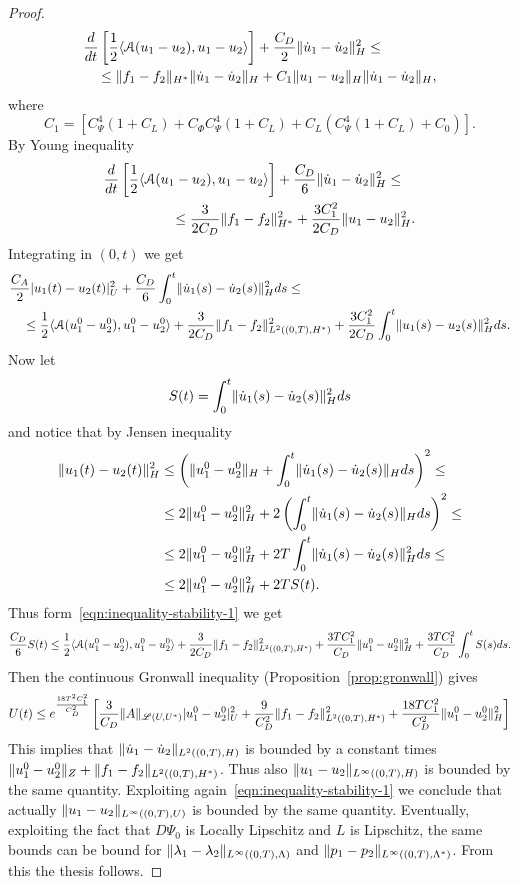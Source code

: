 \documentclass[a4paper,10pt,oneside]{amsbook}
\numberwithin{section}{chapter}
\numberwithin{equation}{chapter}
\theoremstyle{definition}
\DeclarePairedDelimiter{\norm}{\lVert}{\rVert}
\DeclarePairedDelimiter{\dual}{\langle}{\rangle}
\begin{document}
\begin{proof}
\[
\begin{multlined}
\frac{d}{dt}\left[\frac{1}{2}\dual{\mathcal{A}(u_1-u_2),u_1-u_2}\right]+\frac{C_D}{2}\norm{\dot u_1-\dot u_2}_H^2\le\\
\le\norm{f_1-f_2}_{H^*}\norm{\dot u_1-\dot u_2}_H+C_1\norm{u_1-u_2}_H\norm{\dot u_1-\dot u_2}_H,
\end{multlined}
\]
where
\[
C_1=\left[C_\Psi^4(1+C_L)+C_\Phi C_\Psi^4(1+C_L)+C_L(C_\Psi^4(1+C_L)+C_0)\right].
\]
By Young inequality
\[
\begin{multlined}
\frac{d}{dt}\left[\frac{1}{2}\dual{\mathcal{A}(u_1-u_2),u_1-u_2}\right]+\frac{C_D}{6}\norm{\dot u_1-\dot u_2}_H^2\le\\
\le\frac{3}{2C_D}\norm{f_1-f_2}_{H^*}^2+\frac{3C_1^2}{2C_D}\norm{u_1-u_2}_H^2.
\end{multlined}
\]
Integrating in $(0,t)$ we get
\begin{equation}
\label{eqn:inequality-stability-1}
\begin{multlined}
\frac{C_A}{2}|u_1(t)-u_2(t)|_U^2+\frac{C_D}{6}\int_0^t\norm{\dot u_1(s)-\dot u_2(s)}_H^2ds\le\\
\le\frac{1}{2}\dual{\mathcal{A}(u_1^0-u_2^0),u_1^0-u_2^0}+\frac{3}{2C_D}\norm{f_1-f_2}_{L^2((0,T),H^*)}^2+\frac{3C_1^2}{2C_D}\int_0^t\norm{u_1(s)-u_2(s)}_H^2ds.
\end{multlined}
\end{equation}
Now let
\[
S(t)=\int_0^t\norm{\dot u_1(s)-\dot u_2(s)}_H^2ds
\]
and notice that by Jensen inequality
\[
\begin{split}
\norm{u_1(t)-u_2(t)}_H^2&\le\left(\norm{u_1^0-u_2^0}_H+\int_0^t\norm{\dot u_1(s)-\dot u_2(s)}_Hds\right)^2\le\\
&\le2\norm{u_1^0-u_2^0}_H^2+2\left(\int_0^t\norm{\dot u_1(s)-\dot u_2(s)}_Hds\right)^2\le\\
&\le2\norm{u_1^0-u_2^0}_H^2+2T\int_0^t\norm{\dot u_1(s)-\dot u_2(s)}_H^2ds\le\\
&\le2\norm{u_1^0-u_2^0}_H^2+2TS(t).
\end{split}
\]
Thus form~\eqref{eqn:inequality-stability-1} we get
\[
\frac{C_D}{6}S(t)\le\frac{1}{2}\dual{\mathcal{A}(u_1^0-u_2^0),u_1^0-u_2^0}+\frac{3}{2C_D}\norm{f_1-f_2}_{L^2((0,T),H^*)}^2+\frac{3TC_1^2}{C_D}\norm{u_1^0-u_2^0}_H^2+\frac{3TC_1^2}{C_D}\int_0^tS(s)ds.
\]
Then the continuous Gronwall inequality (Proposition~\ref{prop:gronwall}) gives
\[
U(t)\le e^{\frac{18T^2C_1^2}{C_D^2}}\left[\frac{3}{C_D}\|A\|_{\mathscr{L}(U,U^*)}|u_1^0-u_2^0|_U^2+\frac{9}{C_D^2}\|f_1-f_2\|_{L^2((0,T),H^*)}^2+\frac{18TC_1^2}{C_D^2}\norm{u_1^0-u_2^0}_H^2\right]
\]
This implies that $\norm{\dot u_1-\dot u_2}_{L^2((0,T),H)}$ is bounded by a constant times $\norm{u_1^0-u_2^0}_Z+\norm{f_1-f_2}_{L^2((0,T),H^*)}$. Thus also $\norm{u_1-u_2}_{L^\infty((0,T),H)}$ is bounded by the same quantity. Exploiting again~\eqref{eqn:inequality-stability-1} we conclude that actually $\norm{u_1-u_2}_{L^\infty((0,T),U)}$ is bounded by the same quantity. Eventually, exploiting the fact that $D\Psi_0$ is Locally Lipschitz and $L$ is Lipschitz, the same bounds can be bound for $\norm{\lambda_1-\lambda_2}_{L^\infty((0,T),\Lambda)}$ and $\norm{p_1-p_2}_{L^\infty((0,T),\Lambda^*)}$. From this the thesis follows.
\end{proof}
\end{document}
